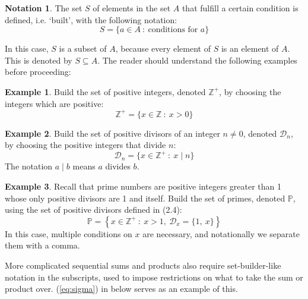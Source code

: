 \documentclass[a4paper, 12pt]{article}
\theoremstyle{definition}
\newtheorem{example}{Example}
\newtheorem*{notation}{Notation}
\begin{document}
\begin{notation}
  The set $S$ of elements in the set $A$ that fulfill a certain condition is defined, i.e. `built', with the following notation:
  \[S = \{a \in A\ :\ \text{conditions for }a\}\]
\end{notation}

In this case, $S$ is a subset of $A$, because every element of $S$ is an element of $A$.
This is denoted by $S\subseteq A$.
The reader should understand the following examples before proceeding:

\begin{example}
  Build the set of positive integers, denoted $\mathbb{Z}^+$, by choosing the integers which are positive:
  \begin{equation}
    \mathbb{Z}^+  = \{x \in \mathbb{Z}\ :\ x > 0 \}
  \end{equation}
\end{example}\vspace{0.5em}

\begin{example}
  Build the set of positive divisors of an integer $n\neq 0$, denoted $\mathcal{D}_n$, by choosing the positive integers that divide $n$:
  \begin{equation}
    \mathcal{D}_n = \{x \in \mathbb{Z}^+\ :\  x \mid n \}
  \end{equation}
  The notation $a\mid b$ means $a$ divides $b$.
\end{example}\vspace{0.5em}

\begin{example}\label{ex:divisor_set}
  Recall that prime numbers are positive integers greater than 1 whose only positive divisors are 1 and itself.
  Build the set of primes, denoted $\mathbb{P}$, using the set of positive divisors defined in (2.4):
  \begin{equation}\label{eq:divisor_set}
    \mathbb{P} = \left\{x \in \mathbb{Z}^+\ :\ x>1,\ \mathcal{D}_x = \{1,\ x\} \right\}
  \end{equation}
  In this case, multiple conditions on $x$ are necessary, and notationally we separate them with a comma.
\end{example}

More complicated sequential sums and products also require set-builder-like notation in the subscripts, used to impose restrictions on what to take the sum or product over.
(\ref{eq:sigma}) in \textbf{} below serves as an example of this.
\end{document}
